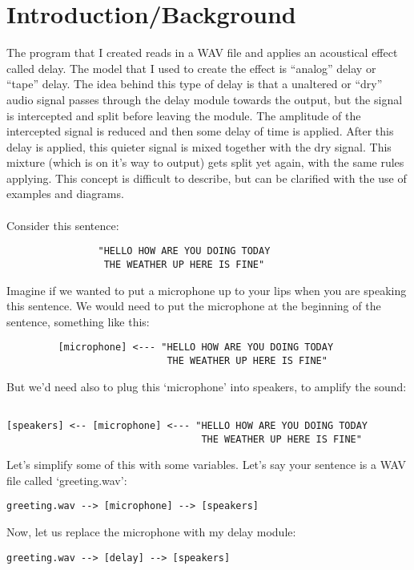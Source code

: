 \documentclass[12pt]{article}
\begin{document}
\maketitle

\tableofcontents
\newpage
\section{Introduction/Background}
The program that I created reads in a WAV file and applies an acoustical effect called delay. The model that I used to create the effect is ``analog'' delay or ``tape'' delay. The idea behind this type of delay is that a unaltered or ``dry'' audio signal passes through the delay module towards the output, but the signal is intercepted and split before leaving the module. The amplitude of the intercepted signal is reduced and then some delay of time is applied. After this delay is applied, this quieter signal is mixed together with the dry signal. This mixture (which is on it's way to output) gets split yet again, with the same rules applying. This concept is difficult to describe, but can be clarified with the use of examples and diagrams.
\\ \\
Consider this sentence:
\begin{verbatim}
                "HELLO HOW ARE YOU DOING TODAY 
                 THE WEATHER UP HERE IS FINE"
\end{verbatim}
Imagine if we wanted to put a microphone up to your lips when you are speaking this sentence. We would need to put the microphone at the beginning of the sentence, something like this:
\begin{verbatim}
         [microphone] <--- "HELLO HOW ARE YOU DOING TODAY 
                            THE WEATHER UP HERE IS FINE"
\end{verbatim}
But we'd need also to plug this `microphone' into speakers, to amplify the sound:
\begin{verbatim}

[speakers] <-- [microphone] <--- "HELLO HOW ARE YOU DOING TODAY 
                                  THE WEATHER UP HERE IS FINE"
\end{verbatim}
Let's simplify some of this with some variables. Let's say your sentence is a WAV file called `greeting.wav':
\begin{verbatim}
greeting.wav --> [microphone] --> [speakers]
\end{verbatim}
Now, let us replace the microphone with my delay module:
\begin{verbatim}
greeting.wav --> [delay] --> [speakers]
\end{verbatim}
\end{document}
